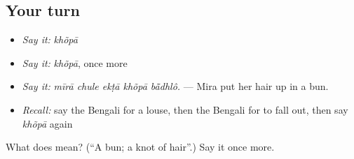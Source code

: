 \subsection*{Your turn}
\begin{itemize}
\raggedright
  \item \emph{Say it:} \emph{khõpā}
  \item \emph{Say it:} \emph{khõpā}, once more
  \item \emph{Say it:} \emph{mīrā chule ekṭā khõpā bā̃dhlô.} — Mira put her hair up in a bun.
  \item \emph{Recall:} say the Bengali for a louse, then the Bengali for to fall out, then say \emph{khõpā} again
\end{itemize}

\begin{tcolorbox}[breakable,colback=teal!4,colframe=teal!35!black,title={Before you move on}]
What does  mean? (\textquotedblleft{}A bun; a knot of hair\textquotedblright{}.) Say it once more.
\end{tcolorbox}
